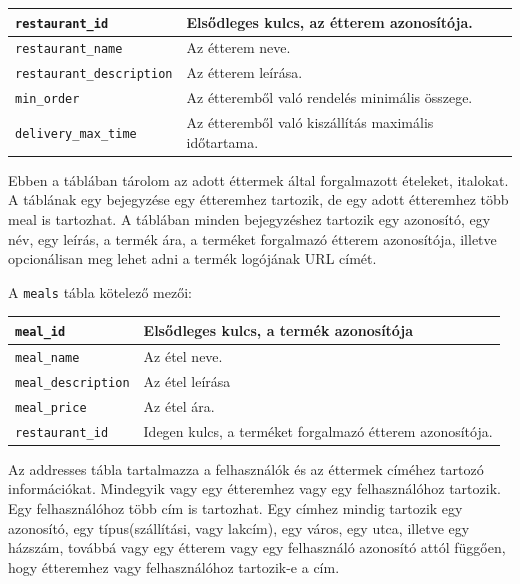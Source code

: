 \bigskip

\begin{tabular}{|p{5cm}|p{8cm}|}
    \hline
    \texttt{restaurant\_id} & Elsődleges kulcs, az étterem azonosítója. \\
    \hline
    \texttt{restaurant\_name} & Az étterem neve. \\
    \hline
    \texttt{restaurant\_description} & Az étterem leírása. \\
    \hline
    \texttt{min\_order} & Az étteremből való rendelés minimális összege. \\
    \hline
    \texttt{delivery\_max\_time} & Az étteremből való kiszállítás maximális időtartama. \\
    \hline
\end{tabular}


Ebben a táblában tárolom az adott éttermek által forgalmazott ételeket, italokat. A táblának egy bejegyzése egy étteremhez tartozik, de egy adott étteremhez több meal is tartozhat. A táblában minden bejegyzéshez tartozik egy azonosító, egy név, egy leírás, a termék ára, a terméket forgalmazó étterem azonosítója, illetve opcionálisan meg lehet adni a termék logójának URL címét.

\bigskip

\noindent A \texttt{meals} tábla kötelező mezői:

\bigskip

\begin{tabular}{|p{4cm}|p{9cm}|}
    \hline
    \texttt{meal\_id} & Elsődleges kulcs, a termék azonosítója \\
    \hline
    \texttt{meal\_name} & Az étel neve. \\
    \hline
    \texttt{meal\_description} & Az étel leírása \\
    \hline
    \texttt{meal\_price} & Az étel ára. \\
    \hline
    \texttt{restaurant\_id} & Idegen kulcs, a terméket forgalmazó étterem azonosítója. \\
    \hline
\end{tabular}


Az addresses tábla tartalmazza a felhasználók és az éttermek címéhez tartozó információkat. Mindegyik vagy egy étteremhez vagy egy felhasználóhoz tartozik. Egy felhasználóhoz több cím is tartozhat. Egy címhez mindig tartozik egy azonosító, egy típus(szállítási, vagy lakcím), egy város, egy utca, illetve egy házszám, továbbá vagy egy étterem vagy egy felhasználó azonosító attól függően, hogy étteremhez vagy felhasználóhoz tartozik-e a cím.

